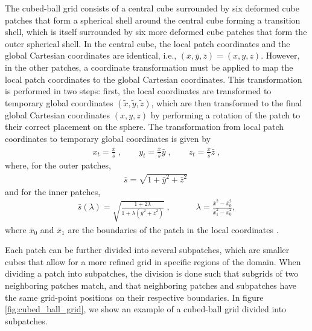 The cubed-ball grid consists of a central cube surrounded by six deformed cube patches that form a spherical shell around the central cube forming a transition shell, which is itself surrounded by six more deformed cube patches that form the outer spherical shell. In the central cube, the local patch coordinates and the global Cartesian coordinates are identical, i.e., $(\bar{x},\bar{y},\bar{z}) = (x,y,z)$. However, in the other patches, a coordinate transformation must be applied to map the local patch coordinates to the global Cartesian coordinates. This transformation is performed in two steps: first, the local coordinates are transformed to temporary global coordinates $(\tilde{x},\tilde{y},\tilde{z})$, which are then transformed to the final global Cartesian coordinates $(x,y,z)$ by performing a rotation of the patch to their correct placement on the sphere. The transformation from local patch coordinates to temporary global coordinates is given by
%
\begin{align}
    x_t = \frac{\bar{x}}{\bar{s}} \; , \quad \quad y_t = \frac{\bar{x}}{\bar{s}} \bar{y} \; ,  \quad \quad z_t = \frac{\bar{x}}{\bar{s}} \bar{z} \; ,
\end{align}
%
where, for the outer patches,
%
\begin{align}
    \bar{s} = \sqrt{1 + \bar{y}^2 + \bar{z}^2} \; 
\end{align}
%
and for the inner patches,
%
\begin{align}
    \bar{s}(\lambda) = \sqrt{\frac{1 + 2\lambda}{1 + \lambda (\bar{y}^2 + \bar{z}^2)}} \; , \quad \quad \quad \lambda = \frac{\bar{x}^2 - \bar{x}_0^2}{\bar{x}_1^2 - \bar{x}_0^2} ,
\end{align}
%
where $\bar{x}_0$ and $\bar{x}_1$ are the boundaries of the patch in the local coordinates \cite{Pseudospectral_method_for_gravitational_wave_collapse}.

Each patch can be further divided into several subpatches, which are smaller cubes that allow for a more refined grid in specific regions of the domain. When dividing a patch into subpatches, the division is done such that subgrids of two neighboring patches match, and that neighboring patches and subpatches have the same grid-point positions on their respective boundaries. In figure \ref{fig:cubed_ball_grid}, we show an example of a cubed-ball grid divided into subpatches.

